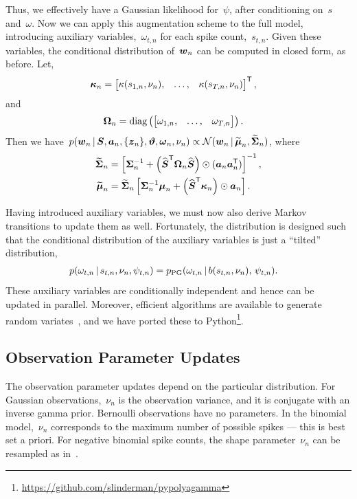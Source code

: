 Thus, we effectively have a Gaussian likelihood for~$\psi$, after conditioning 
on~$s$ and~$\omega$. Now we can apply this augmentation scheme to the full
model, introducing auxiliary variables,~$\omega_{t,n}$ for each spike count,~$s_{t,n}$.
Given these variables, the conditional distribution of~$\boldsymbol{w}_n$ can be computed in closed form,
as before. Let,
\begin{align*}
  \boldsymbol{\kappa}_n
  &= \begin{bmatrix} \kappa(s_{1,n}, \nu_n), &\ldots, &\kappa(s_{T,n}, \nu_n)
  \end{bmatrix}^{\mathsf{T}},
\end{align*}
and
\begin{align*}
  \boldsymbol{\Omega}_n &= \mathrm{diag} \left(
  \begin{bmatrix}
    \omega_{1,n}, & \ldots, & \omega_{T,n}
  \end{bmatrix}
  \right).
\end{align*}
Then we have~$
  p(\boldsymbol{w}_n \,|\, \boldsymbol{S}, \boldsymbol{a}_n, \{\boldsymbol{z}_n\}, \boldsymbol{\vartheta}, \boldsymbol{\omega}_n, \nu_n)
  \propto \mathcal{N}(\boldsymbol{w}_n \,|\, \widetilde{\boldsymbol{\mu}}_n, \widetilde{\boldsymbol{\Sigma}}_n)$,
where
\begin{align*}
  \widetilde{\boldsymbol{\Sigma}}_n &= \left[ \boldsymbol{\Sigma}_n^{-1} +
  \left(\widehat{\boldsymbol{S}}^{\mathsf{T}} \boldsymbol{\Omega}_n \widehat{\boldsymbol{S}} \right) \odot (\boldsymbol{a}_n \boldsymbol{a}_n^{\mathsf{T}}) \right]^{-1}, \\
  \widetilde{\boldsymbol{\mu}}_n &= \widetilde{\boldsymbol{\Sigma}}_n \left[ \boldsymbol{\Sigma}_n^{-1} \boldsymbol{\mu}_n +
  \left(\widehat{\boldsymbol{S}}^{\mathsf{T}} \boldsymbol{\kappa}_n \right) \odot \boldsymbol{a}_n \right].
\end{align*}

Having introduced auxiliary variables, we must now also derive
Markov transitions to update them as well. Fortunately, the
\polyagamma distribution is designed such that the conditional
distribution of the auxiliary variables is just a ``tilted'' \polyagamma
distribution,
\begin{align*}
  p(\omega_{t,n} \,|\, s_{t,n}, \nu_n, \psi_{t,n})
  &= p_{\mathrm{PG}}(\omega_{t,n} \,|\, b(s_{t,n}, \nu_n), \, \psi_{t,n}).
\end{align*}
These auxiliary variables are conditionally independent and hence can
be updated in parallel. Moreover, efficient algorithms are available
to generate \polyagamma random variates~\citep{windle2014sampling}, and
we have ported these to Python\footnote{\url{https://github.com/slinderman/pypolyagamma}}.

\subsection{Observation Parameter Updates}
The observation parameter updates depend on the particular distribution.
For Gaussian observations,~$\nu_n$ is the observation variance, and
it is conjugate with an inverse gamma prior.
Bernoulli observations have no parameters.
In the binomial model,~$\nu_n$ corresponds to the maximum number of
possible spikes --- this is best set a priori.
For negative binomial spike counts, the shape parameter~$\nu_n$ can
be resampled as in~\citep{Zhou2012}.


